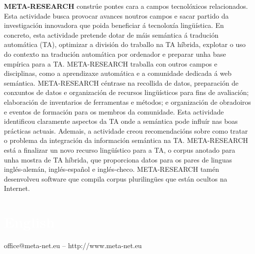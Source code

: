 \begin{multicols}{2}
\begin{itemize}
\begin{multicols}{2}
 \textbf{META-RESEARCH} constrúe pontes cara a campos tecnolóxicos relacionados. Esta actividade busca provocar avances noutros campos e sacar partido da investigación innovadora que poida beneficiar á tecnoloxía lingüística. En concreto, esta actividade pretende dotar de máis semántica á tradución automática (TA), optimizar a división do traballo na TA híbrida, explotar o uso do contexto na tradución automática por ordenador e preparar unha base empírica para a TA. META-RESEARCH traballa con outros campos e disciplinas, como a aprendizaxe automática e a comunidade dedicada á web semántica. META-RESEARCH céntrase na recollida de datos, preparación de conxuntos de datos e organización de recursos lingüísticos para fins de avaliación; elaboración de inventarios de ferramentas e métodos; e organización de obradoiros e eventos de formación para os membros da comunidade. Esta actividade identificou claramente aspectos da TA onde a semántica pode influír nas boas prácticas actuais. Ademais, a actividade creou recomendacións sobre como tratar o problema da integración da información semántica na TA. META-RESEARCH está a finalizar un novo recurso lingüístico para a TA, o corpus anotado para unha mostra de TA híbrida, que proporciona datos para os pares de linguas inglés-alemán, inglés-español e inglés-checo. META-RESEARCH tamén desenvolveu software que compila corpus plurilingües que están ocultos na Internet.
 

\end{multicols}
\cleardoublepage

\vfill

\makeatletter
{}
{
  \renewcommand*{\theHsection}{\thepart.\thesection}
}
\makeatother
\part*{\textcolor{white}{English}}
\setcounter{section}{0}
\setcounter{figure}{0}

\centerline{office@meta-net.eu -- http://www.meta-net.eu}


\cleardoublepage




\end{itemize}
\end{multicols}
